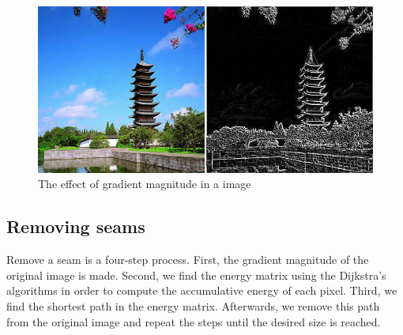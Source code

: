 \documentclass{article}
\begin{document}
	\begin{figure} [H]
		\centering
		\includegraphics[scale=0.3]{images/intelligent2}
		\caption{The effect of gradient magnitude in a image\label{castle}}
	\end{figure}

	
	\subsection{Removing seams}
	Remove a seam is a four-step process. First, the gradient magnitude of the original image is made. Second,  we find the energy matrix using the Dijkstra's algorithms in order to compute the accumulative energy of each pixel. Third, we find the shortest path in the energy matrix. Afterwards, we remove this path from the original image and repeat the steps until the desired size is reached.

{}

\end{document}
